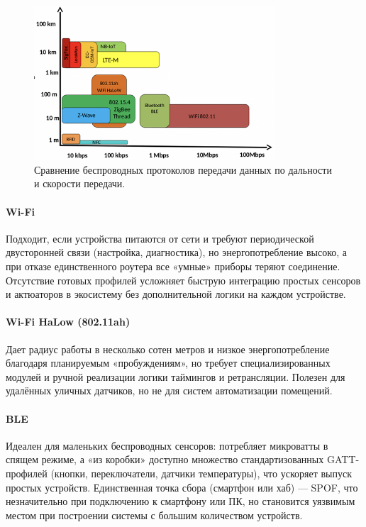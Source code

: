 \documentclass[a4paper,12pt]{article}
\begin{document}
\begin{figure}[h]
    \centering
    \includegraphics[width=0.8\textwidth]{images/Fig07.png}
    \captionsetup{justification=centering}
    \caption{Сравнение беспроводных протоколов передачи данных по дальности и скорости передачи. \cite{IMG_protocol_compare} }
    \label{fig:protocols_range_vs_speed}
\end{figure}


\paragraph{Wi-Fi}
Подходит, если устройства питаются от сети и требуют периодической двусторонней связи (настройка, диагностика), но энергопотребление высоко, а при отказе единственного роутера все «умные» приборы теряют соединение. Отсутствие готовых профилей усложняет быструю интеграцию простых сенсоров и актюаторов в экосистему без дополнительной логики на каждом устройстве.

\paragraph{Wi-Fi HaLow (802.11ah)}
Дает радиус работы в несколько сотен метров и низкое энергопотребление благодаря планируемым «пробуждениям», но требует специализированных модулей и ручной реализации логики таймингов и ретрансляции. Полезен для удалённых уличных датчиков, но не для систем автоматизации помещений.

\paragraph{BLE}
Идеален для маленьких беспроводных сенсоров: потребляет микроватты в спящем режиме, а «из коробки» доступно множество стандартизованных GATT-профилей (кнопки, переключатели, датчики температуры), что ускоряет выпуск простых устройств. Единственная точка сбора (смартфон или хаб) — SPOF, что незначительно при подключению к смартфону или ПК, но становится уязвимым местом при построении системы с большим количеством устройств.
\end{document}
